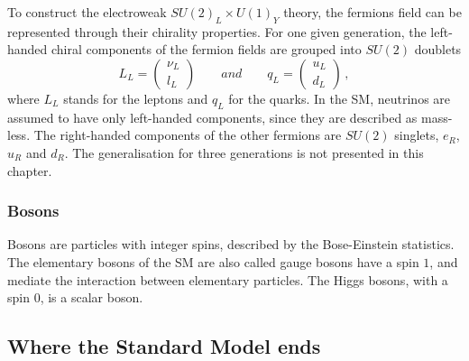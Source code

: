 To construct the electroweak $SU(2)_L \times U(1)_Y$ theory, the fermions field can be represented through their chirality properties.
For one given generation, the left-handed chiral components of the fermion fields are grouped into $SU(2)$ doublets
\begin{equation}
  L_{L}=
  \begin{pmatrix}
    \nu_{L} \\
    l_{L}
  \end{pmatrix}
  \qquad and \qquad
  q_{L}=
 \begin{pmatrix}
    u_{L} \\
    d_{L}
 \end{pmatrix}
 \,,
 \label{eq:fermion_doublet}
\end{equation}
where $L_L$ stands for the leptons and $q_L$ for the quarks.
In the SM, neutrinos are assumed to have only left-handed components, since they are described as mass-less.
The right-handed components of the other fermions are $SU(2)$ singlets, $e_R$, $u_R$ and $d_R$.
The generalisation for three generations is not presented in this chapter.

\subsubsection*{Bosons}

Bosons are particles with integer spins, described by the Bose-Einstein statistics.
The elementary bosons of the SM are also called gauge bosons have a spin $1$, and mediate the interaction between elementary particles.
The Higgs bosons, with a spin $0$, is a scalar boson.

\subsection{Where the Standard Model ends}


